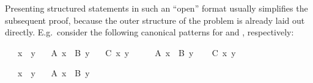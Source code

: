 \begin{isabellebody}
\begin{isamarkuptext}
  Presenting structured statements in such an ``open'' format usually
  simplifies the subsequent proof, because the outer structure of the
  problem is already laid out directly.  E.g.\ consider the following
  canonical patterns for  and ,
  respectively:%
\end{isamarkuptext}%
\isamarkuptrue%
%
\begin{minipage}{0.5\textwidth}
\isamarkupfalse%
\isanewline
\ \ \ x\ \ y\isanewline
\ \ \ {}A\ x{}\ \ {}B\ y{}\isanewline
\ \ \ {}C\ x\ y{}\isanewline
%
\isadelimproof
%
\endisadelimproof
%
\isatagproof
{}\isamarkupfalse%
\ {}\isanewline
\ \ \isamarkupfalse%
\ {}A\ x{}\ \ {}B\ y{}\isanewline
\ \ \isamarkupfalse%
\ {}C\ x\ y{}%
\endisatagproof
{\isafoldproof}%
%
\isadelimproof
%
\endisadelimproof
%
\isadelimnoproof
\ %
\endisadelimnoproof
%
\isatagnoproof
{}\isamarkupfalse%
%
\endisatagnoproof
{\isafoldnoproof}%
%
\isadelimnoproof
\isanewline
%
\endisadelimnoproof
%
\isadelimproof
%
\endisadelimproof
%
\isatagproof
{}\isamarkupfalse%
%
\endisatagproof
{\isafoldproof}%
%
\isadelimproof
%
\endisadelimproof
%
\end{minipage}\begin{minipage}{0.5\textwidth}
\isamarkupfalse%
\isanewline
\ \ \ x\ \ y\isanewline
\ \ \ {}A\ x{}\ \ {}B\ y{}\isanewline
%
\isadelimproof
%
\endisadelimproof
%
\isatagproof
{}\isamarkupfalse%

\end{minipage}
\end{isabellebody}
